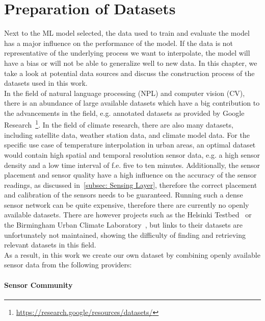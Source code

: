 \chapter{Preparation of Datasets}
\label{chap:preparations data sets}

Next to the ML model selected, the data used to train and evaluate the model has a major influence on the performance of the model. If the data is not representative of the underlying process we want to interpolate, the model will have a bias or will not be able to generalize well to new data. In this chapter, we take a look at potential data sources and discuss the construction process of the datasets used in this work.\\
In the field of natural language processing (NPL) and computer vision (CV), there is an abundance of large available datasets which have a big contribution to the advancements in the field, e.g. annotated datasets as provided by Google Research~\footnote{\url{https://research.google/resources/datasets/}}. In the field of climate research, there are also many datasets, including satellite data, weather station data, and climate model data. For the specific use case of temperature interpolation in urban areas, an optimal dataset would contain high spatial and temporal resolution sensor data, e.g. a high sensor density and a low time interval of f.e. five to ten minutes. Additionally, the sensor placement and sensor quality have a high influence on the accuracy of the sensor readings, as discussed in~\ref{subsec: Sensing Layer}, therefore the correct placement and calibration of the sensors needs to be guaranteed. Running such a dense sensor network can be quite expensive, therefore there are currently no openly available datasets. There are however projects such as the Helsinki Testbed~\cite{koskinen2011helsinki} or the Birmingham Urban Climate Laboratory~\cite{warren2016birmingham}, but links to their datasets are unfortunately not maintained, showing the difficulty of finding and retrieving relevant datasets in this field.\\
As a result, in this work we create our own dataset by combining openly available sensor data from the following providers:

\subsubsection{Sensor Community}

